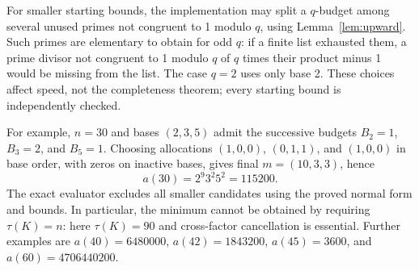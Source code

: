 For smaller starting bounds, the implementation may split a $q$-budget
among several unused primes not congruent to 1 modulo $q$, using
Lemma~\ref{lem:upward}. Such primes are elementary to obtain for odd
$q$: if a finite list exhausted them, a prime divisor not congruent to 1
modulo $q$ of $q$ times their product minus 1 would be missing from the
list. The case $q=2$ uses only base 2. These choices affect speed, not
the completeness theorem; every starting bound is independently checked.

For example, $n=30$ and bases $(2,3,5)$ admit the successive budgets
$B_2=1$, $B_3=2$, and $B_5=1$. Choosing allocations $(1,0,0)$,
$(0,1,1)$, and $(1,0,0)$ in base order, with zeros on inactive bases,
gives final $m=(10,3,3)$, hence
\[
 a(30)=2^9 3^2 5^2=115200.
\]
The exact evaluator excludes all smaller candidates using the proved
normal form and bounds. In particular, the minimum cannot be obtained
by requiring $\tau(K)=n$: here $\tau(K)=90$ and cross-factor cancellation
is essential. Further examples are
$a(40)=6480000$, $a(42)=1843200$, $a(45)=3600$, and $a(60)=4706440200$.
